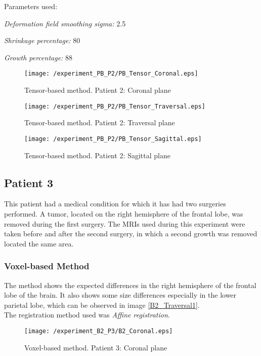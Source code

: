 Parameters used:
\begin{description}
\item \textit{Deformation field smoothing sigma:} 2.5
\item \textit{Shrinkage percentage:} 80
\item \textit{Growth percentage:} 88
\end{description}

\begin{figure}[H]
  \centering
  \texttt{[image: /experiment\_PB\_P2/PB\_Tensor\_Coronal.eps]}
  \caption{Tensor-based method. Patient 2: Coronal plane}
  \label{PB_TCoronal}
\end{figure}

\begin{figure}[H]
  \centering
  \texttt{[image: /experiment\_PB\_P2/PB\_Tensor\_Traversal.eps]}
  \caption{Tensor-based method. Patient 2: Traversal plane}
  \label{PB_TTraversal}
\end{figure}

\begin{figure}[H]
  \centering
  \texttt{[image: /experiment\_PB\_P2/PB\_Tensor\_Sagittal.eps]}
  \caption{Tensor-based method. Patient 2: Sagittal plane}
  \label{PB_TSagittal}
\end{figure}


\subsection{Patient 3}
This patient had a medical condition for which it has had two
surgeries performed. A tumor, located on the right hemisphere of the
frontal lobe, was removed during the first surgery. The MRIs used
during this experiment were taken before and after the second surgery,
in which a second growth was removed located the same area.


\subsubsection{Voxel-based Method}
The method shows the expected differences in the right hemisphere of
the frontal lobe of the brain. It also shows some size differences
especially in the lower parietal lobe, which can be observed in image
\ref{B2_Traversal1}.\\

The registration method used was \textit{Affine registration}.

\begin{figure}[H]
  \centering
  \texttt{[image: /experiment\_B2\_P3/B2\_Coronal.eps]}
  \caption{Voxel-based method. Patient 3: Coronal plane}
  \label{B2_Coronal}
\end{figure}


